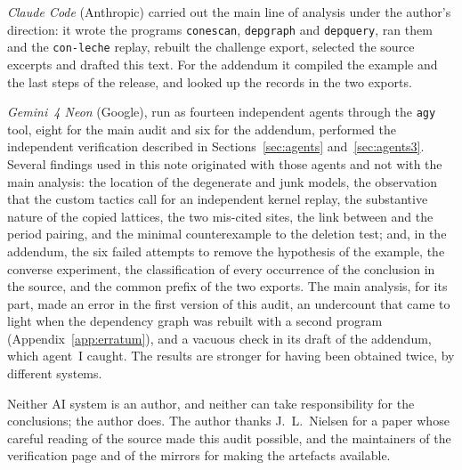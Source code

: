 \emph{Claude Code} (Anthropic) carried out the main line of analysis under the author's direction: it wrote the programs \texttt{conescan}, \texttt{depgraph} and \texttt{depquery}, ran them and the \texttt{con-leche} replay,
rebuilt the challenge export, selected the source excerpts and drafted this text. For the addendum it compiled the example and the last steps of the release, and looked up the records in the two exports.

\emph{Gemini~4 Neon} (Google), run as fourteen independent agents through the \texttt{agy} tool, eight for the main audit and six for the addendum, performed the independent verification described in Sections~\ref{sec:agents} and~\ref{sec:agents3}.
Several findings used in this note originated with those agents and not with the main analysis: the location of the degenerate and junk models, the observation that the custom tactics call for an independent kernel replay,
the substantive nature of the copied lattices, the two mis-cited sites, the link between  and the period pairing, and the minimal counterexample to the deletion test;
and, in the addendum, the six failed attempts to remove the hypothesis of the example, the converse experiment, the classification of every occurrence of the conclusion in the source, and the common prefix of the two exports.
The main analysis, for its part, made an error in the first version of this audit, an undercount that came to light when the dependency graph was rebuilt with a second program (Appendix~\ref{app:erratum}),
and a vacuous check in its draft of the addendum, which agent~I caught. The results are stronger for having been obtained twice, by different systems.

Neither AI system is an author, and neither can take responsibility for the conclusions; the author does.
The author thanks J.~L.~Nielsen for a paper whose careful reading of the source made this audit possible, and the maintainers of the verification page and of the mirrors for making the artefacts available.

